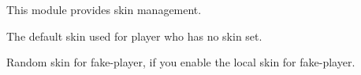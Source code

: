 This module provides skin management.


The default skin used for player who has no skin set.

Random skin for fake-player, if you enable the local skin for fake-player.